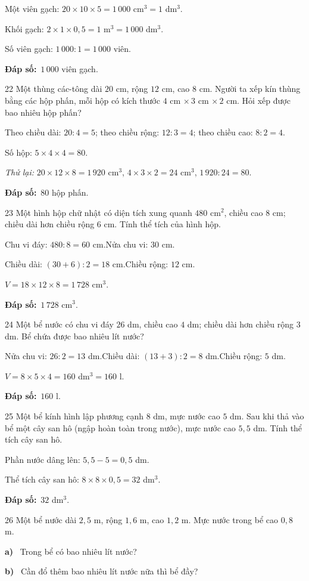 \documentclass[11pt]{article}
\newif\ifsol \solfalse
\providecommand{\AnsWord}{Đáp số}
\newcommand{\dapso}[1]{\par\textbf{\AnsWord:}\ #1}
\newcommand{\probsol}[1]{%
  \begin{lrbox}{\solmeasure}\begin{minipage}{\dimexpr\linewidth-24pt\relax}#1\end{minipage}\end{lrbox}%
  \ifsol
    \begin{solbox}#1\end{solbox}%
  \else
    \setlength{\solht}{\dimexpr\ht\solmeasure+\dp\solmeasure+0.85cm\relax}%
    \ifdim\solht<1.35cm\setlength{\solht}{1.35cm}\fi
    \begin{tcolorbox}[colback=white,colframe=Line,boxrule=0.8pt,arc=5pt,
      left=8pt,right=8pt,top=4pt,bottom=4pt,height=\solht]{\footnotesize\color{Slate}\itshape\WorkWord}\end{tcolorbox}%
  \fi}
\newcommand{\pa}[1]{\textbf{#1)}\ }
\newcommand{\gap}{\vspace{0.3cm}}
\def\WorkWord{Bài làm:}
\def\AnsWord{Đáp số}
\begin{document}
\probsol{
Một viên gạch: $20\times10\times5=1\,000$ cm$^3=1$ dm$^3$.\par
Khối gạch: $2\times1\times0{,}5=1$ m$^3=1\,000$ dm$^3$.\par
Số viên gạch: $1\,000:1=1\,000$ viên.
\dapso{$1\,000$ viên gạch.}}
\gap
\begin{probbox}{22}{\relax}
Một thùng các-tông dài $20$ cm, rộng $12$ cm, cao $8$ cm. Người ta xếp kín thùng bằng các hộp phấn, mỗi hộp có kích thước $4$ cm $\times\,3$ cm $\times\,2$ cm. Hỏi xếp được bao nhiêu hộp phấn?
\end{probbox}
\probsol{
Theo chiều dài: $20:4=5$; theo chiều rộng: $12:3=4$; theo chiều cao: $8:2=4$.\par
Số hộp: $5\times4\times4=80$.\par
\emph{Thử lại:} $20\times12\times8=1\,920$ cm$^3$, $4\times3\times2=24$ cm$^3$, $1\,920:24=80$.
\dapso{$80$ hộp phấn.}}
\gap
\begin{probbox}{23}{\relax}
Một hình hộp chữ nhật có diện tích xung quanh $480$ cm$^2$, chiều cao $8$ cm; chiều dài hơn chiều rộng $6$ cm. Tính thể tích của hình hộp.
\end{probbox}
\probsol{
Chu vi đáy: $480:8=60$ cm.\quad Nửa chu vi: $30$ cm.\par
Chiều dài: $(30+6):2=18$ cm.\quad Chiều rộng: $12$ cm.\par
$V=18\times12\times8=1\,728$ cm$^3$.
\dapso{$1\,728$ cm$^3$.}}
\gap
\begin{probbox}{24}{\relax}
Một bể nước có chu vi đáy $26$ dm, chiều cao $4$ dm; chiều dài hơn chiều rộng $3$ dm. Bể chứa được bao nhiêu lít nước?
\end{probbox}
\probsol{
Nửa chu vi: $26:2=13$ dm.\quad Chiều dài: $(13+3):2=8$ dm.\quad Chiều rộng: $5$ dm.\par
$V=8\times5\times4=160$ dm$^3=160$ l.
\dapso{$160$ l.}}
\gap
\begin{probbox}{25}{\relax}
Một bể kính hình lập phương cạnh $8$ dm, mực nước cao $5$ dm. Sau khi thả vào bể một cây san hô (ngập hoàn toàn trong nước), mực nước cao $5{,}5$ dm. Tính thể tích cây san hô.
\end{probbox}
\probsol{
Phần nước dâng lên: $5{,}5-5=0{,}5$ dm.\par
Thể tích cây san hô: $8\times8\times0{,}5=32$ dm$^3$.
\dapso{$32$ dm$^3$.}}
\gap
\begin{probbox}{26}{\relax}
Một bể nước dài $2{,}5$ m, rộng $1{,}6$ m, cao $1{,}2$ m. Mực nước trong bể cao $0{,}8$ m.\par
\pa{a} Trong bể có bao nhiêu lít nước?\par
\pa{b} Cần đổ thêm bao nhiêu lít nước nữa thì bể đầy?
\end{probbox}
\end{document}
